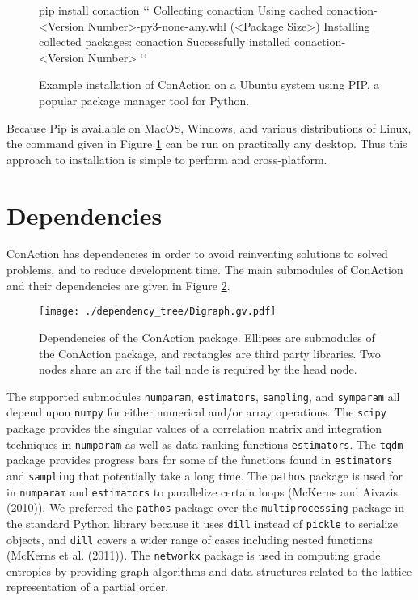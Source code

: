 \documentclass[
  letterpaper,
  DIV=11,
  numbers=noendperiod]{scrreprt}
\begin{document}
\begin{figure}[H]
\begin{ubuntu}
pip install conaction `\StartConsole`
Collecting conaction
  Using cached conaction-<Version Number>-py3-none-any.whl (<Package Size>)
Installing collected packages: conaction
Successfully installed conaction-<Version Number> ``
\end{ubuntu}
\caption{Example installation of ConAction on a Ubuntu system using PIP, a popular package manager tool for Python.}
\label{fig:installation}
\end{figure}

Because Pip is available on MacOS, Windows, and various distributions of
Linux, the command given in Figure \ref{fig:installation} can be run on
practically any desktop. Thus this approach to installation is simple to
perform and cross-platform.

\section{Dependencies}\label{dependencies}

ConAction has dependencies in order to avoid reinventing solutions to
solved problems, and to reduce development time. The main submodules of
ConAction and their dependencies are given in Figure \ref{fig:dep_tree}.

\begin{figure}[H]
\centering
\texttt{[image: ./dependency\_tree/Digraph.gv.pdf]}
\caption{Dependencies of the ConAction package. Ellipses are submodules of the ConAction package, and rectangles are third party libraries. Two nodes share an arc if the tail node is required by the head node.}
\label{fig:dep_tree}
\end{figure}

The supported submodules \texttt{numparam}, \texttt{estimators},
\texttt{sampling}, and \texttt{symparam} all depend upon \texttt{numpy}
for either numerical and/or array operations. The \texttt{scipy} package
provides the singular values of a correlation matrix and integration
techniques in \texttt{numparam} as well as data ranking functions
\texttt{estimators}. The \texttt{tqdm} package provides progress bars
for some of the functions found in \texttt{estimators} and
\texttt{sampling} that potentially take a long time. The \texttt{pathos}
package is used for in \texttt{numparam} and \texttt{estimators} to
parallelize certain loops (McKerns and Aivazis (2010)). We preferred the
\texttt{pathos} package over the \texttt{multiprocessing} package in the
standard Python library because it uses \texttt{dill} instead of
\texttt{pickle} to serialize objects, and \texttt{dill} covers a wider
range of cases including nested functions (McKerns et al. (2011)). The
\texttt{networkx} package is used in computing grade entropies by
providing graph algorithms and data structures related to the lattice
representation of a partial order.
\end{document}
